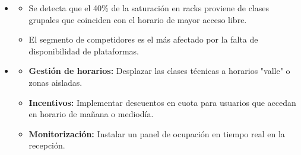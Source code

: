 \begin{solution}
	\begin{itemize}


		\item {}
		      \begin{itemize}
			      \item Se detecta que el 40\% de la saturación en racks proviene de clases grupales que coinciden con el horario de mayor acceso libre.
			      \item El segmento de competidores es el más afectado por la falta de disponibilidad de plataformas.
		      \end{itemize}

		\item {}
		      \begin{itemize}
			      \item \textbf{Gestión de horarios:} Desplazar las clases técnicas a horarios "valle" o zonas aisladas.
			      \item \textbf{Incentivos:} Implementar descuentos en cuota para usuarios que accedan en horario de mañana o mediodía.
			      \item \textbf{Monitorización:} Instalar un panel de ocupación en tiempo real en la recepción.
		      \end{itemize}
	\end{itemize}
\end{solution}

